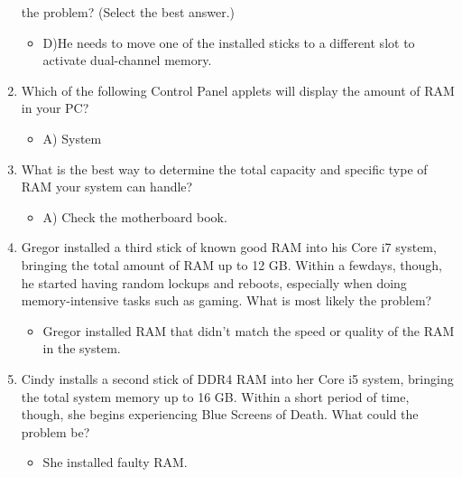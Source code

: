\documentclass{article}
\begin{document}
\begin{enumerate}
the problem? (Select the best answer.)
    \begin{itemize}
        \item D)He needs to move one of the installed sticks to a different slot to
activate dual-channel memory.
    \end{itemize}
    \item Which of the following Control Panel applets will display the amount
of RAM in your PC?
    \begin{itemize}
        \item A) System 
    \end{itemize}
    \item What is the best way to determine the total capacity and specific type
of RAM your system can handle?
    \begin{itemize}
        \item A) Check the motherboard book.
    \end{itemize}
    \item Gregor installed a third stick of known good RAM into his Core i7
system, bringing the total amount of RAM up to 12 GB. Within a fewdays, though, he started having random lockups and reboots,
especially when doing memory-intensive tasks such as gaming. What
is most likely the problem?
    \begin{itemize}
        \item Gregor installed RAM that didn’t match the speed or quality of
the RAM in the system.
    \end{itemize}
    \item Cindy installs a second stick of DDR4 RAM into her Core i5 system,
bringing the total system memory up to 16 GB. Within a short period
of time, though, she begins experiencing Blue Screens of Death. What
could the problem be?
    \begin{itemize}
        \item She installed faulty RAM.
    \end{itemize}
\end{enumerate}
\end{document}
